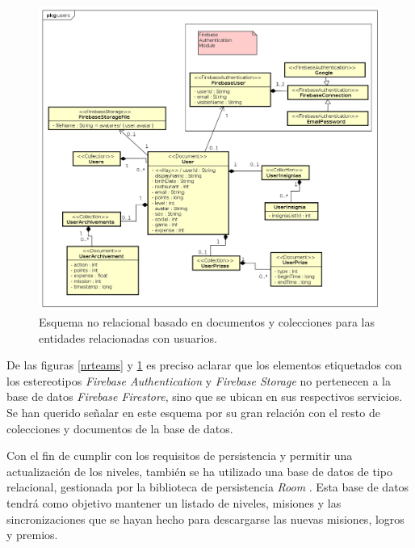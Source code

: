 \documentclass[twoside]{report}
\begin{document}
\begin{figure}[H]
\centering
\includegraphics[scale=0.5]{images/databaseNRusers}
\caption{Esquema no relacional basado en documentos y colecciones para las entidades relacionadas con usuarios.}
\label{nrusers}
\end{figure}

De las figuras \ref{nrteams} y \ref{nrusers} es preciso aclarar que los elementos etiquetados con los estereotipos \textit{Firebase Authentication} y \textit{Firebase Storage} no pertenecen a la base de datos \textit{Firebase Firestore}, sino que se ubican en sus respectivos servicios. Se han querido señalar en este esquema por su gran relación con el resto de colecciones y documentos de la base de datos.


Con el fin de cumplir con los requisitos de persistencia y permitir una actualización de los niveles, también se ha utilizado una base de datos de tipo relacional, gestionada por la biblioteca de persistencia  \textit{Room} \cite{roompersistence}. Esta base de datos tendrá como objetivo mantener un listado de niveles, misiones y las sincronizaciones que se hayan hecho para descargarse las nuevas misiones, logros y premios.
\end{document}
